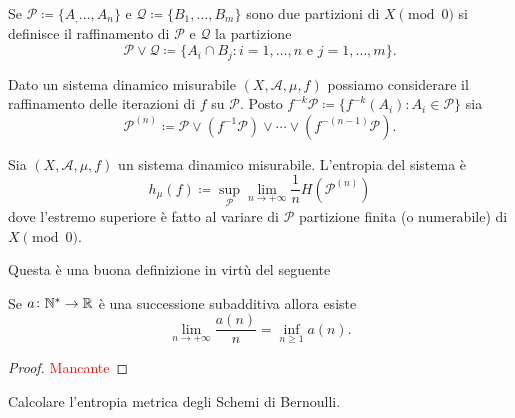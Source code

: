 \begin{definition}
    Se $ \mathcal{P} \coloneqq \{A_, \ldots, A_n\} $ e $ \mathcal{Q} \coloneqq \{B_1, \ldots, B_m\} $ sono due partizioni di $ X \pmod{0} $ si definisce il raffinamento di $ \mathcal{P} $ e $ \mathcal{Q} $ la partizione
    \[
        \mathcal{P} \vee \mathcal{Q} \coloneqq \{A_i \cap B_j : i = 1, \ldots, n \text{ e } j = 1, \ldots, m\}.
    \]
\end{definition}

Dato un sistema dinamico misurabile $ (X, \mathcal{A}, \mu, f) $ possiamo considerare il raffinamento delle iterazioni di $ f $ su $ \mathcal{P} $. Posto $ f^{-k}\mathcal{P} \coloneqq \{f^{-k}(A_i) : A_i \in \mathcal{P}\} $ sia
\[
    \mathcal{P}^{(n)} \coloneqq \mathcal{P} \vee (f^{-1}\mathcal{P}) \vee \cdots \vee (f^{-(n-1)}\mathcal{P}).
\]

\begin{definition}
    Sia $ (X, \mathcal{A}, \mu, f) $ un sistema dinamico misurabile. L'entropia del sistema è
    \[
        h_\mu(f) \coloneqq \sup_\mathcal{P} {\lim_{n \to +\infty} \frac{1}{n}H(\mathcal{P}^{(n)})}
    \]
    dove l'estremo superiore è fatto al variare di $ \mathcal{P} $ partizione finita (o numerabile) di $ X \pmod{0} $.
\end{definition}

Questa è una buona definizione in virtù del seguente
\begin{lemma}[Fekete]
    Se $ a \colon \mathbb{N}^{*} \to \mathbb{R} $ è una successione subadditiva allora esiste
    \[
        \lim_{n\to+\infty} \frac{a(n)}{n} = \inf_{n\geq1}a(n).
    \]
\end{lemma}
\begin{proof}
    \textcolor{red}{Mancante}
\end{proof}

\begin{exercise}
    Calcolare l'entropia metrica degli Schemi di Bernoulli.
\end{exercise}

